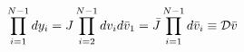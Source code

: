 \begin{equation}
\prod_{i=1}^{N-1} dy_i =J \prod_{i=2}^{N-1} dv_i d\bar v_1
=\bar J \prod_{i=1}^{N-1} d\bar v_i \equiv {\cal D}\bar v \label{B10}
\end{equation}

